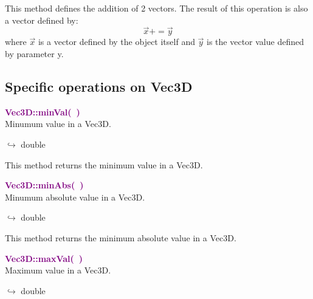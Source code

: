 This method defines the addition of 2 vectors.
The result of this operation is also a vector defined by:
\begin{equation*}
\overrightarrow{x} += \overrightarrow{y}
\end{equation*}
where $\overrightarrow{x}$ is a vector defined by the object itself and $\overrightarrow{y}$ is the vector value defined by parameter y.

\subsection{Specific operations on Vec3D}

\textcolor{purple}{\textbf{Vec3D::minVal(~)}}\label{Vec3D::minVal()}\\
Minumum value in a Vec3D.\vspace*{-0.5em}
\begin{tcolorbox}[grow to left by=-1cm, width=\textwidth-1cm,myArgs,tabularx={l|R}]
$\hookrightarrow$ double
\end{tcolorbox}

This method returns the minimum value in a Vec3D.

\textcolor{purple}{\textbf{Vec3D::minAbs(~)}}\label{Vec3D::minAbs()}\\
Minumum absolute value in a Vec3D.\vspace*{-0.5em}
\begin{tcolorbox}[grow to left by=-1cm, width=\textwidth-1cm,myArgs,tabularx={l|R}]
$\hookrightarrow$ double
\end{tcolorbox}

This method returns the minimum absolute value in a Vec3D.

\textcolor{purple}{\textbf{Vec3D::maxVal(~)}}\label{Vec3D::maxVal()}\\
Maximum value in a Vec3D.\vspace*{-0.5em}
\begin{tcolorbox}[grow to left by=-1cm, width=\textwidth-1cm,myArgs,tabularx={l|R}]
$\hookrightarrow$ double
\end{tcolorbox}

